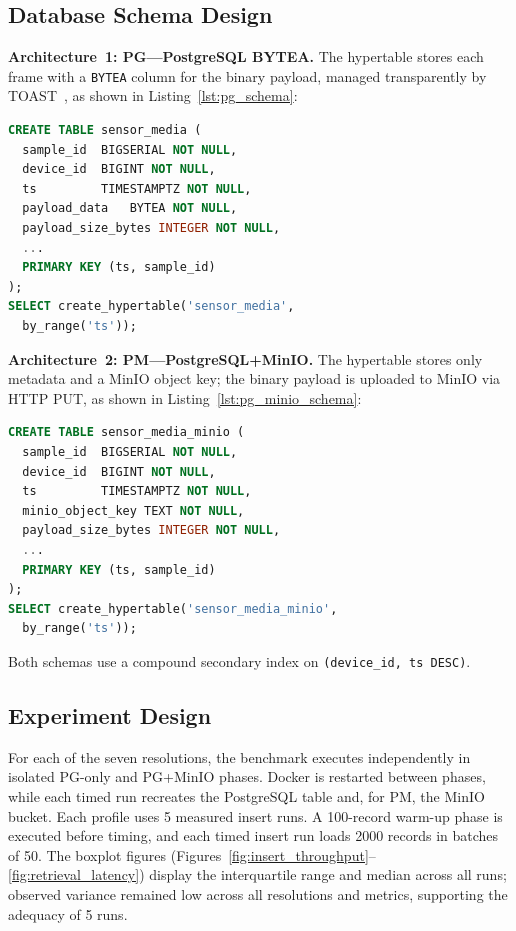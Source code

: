 \documentclass[conference, a4paper]{IEEEtran}
\begin{document}
\subsection{Database Schema Design}
\textbf{Architecture~1: PG---PostgreSQL BYTEA.} The hypertable stores each frame with a \texttt{BYTEA} column for the binary payload, managed transparently by TOAST~\cite{postgresql_toast_docs}, as shown in Listing~\ref{lst:pg_schema}:

\begin{lstlisting}[language=SQL,basicstyle=\ttfamily\scriptsize,breaklines=true,caption={PG schema: inline BYTEA storage.},label={lst:pg_schema}]
CREATE TABLE sensor_media (
  sample_id  BIGSERIAL NOT NULL,
  device_id  BIGINT NOT NULL,
  ts         TIMESTAMPTZ NOT NULL,
  payload_data   BYTEA NOT NULL,
  payload_size_bytes INTEGER NOT NULL,
  ...
  PRIMARY KEY (ts, sample_id)
);
SELECT create_hypertable('sensor_media',
  by_range('ts'));
\end{lstlisting}

\textbf{Architecture~2: PM---PostgreSQL+MinIO.} The hypertable stores only metadata and a MinIO object key; the binary payload is uploaded to MinIO via HTTP PUT, as shown in Listing~\ref{lst:pg_minio_schema}:

\begin{lstlisting}[language=SQL,basicstyle=\ttfamily\scriptsize,breaklines=true,caption={PM schema: externalized MinIO storage.},label={lst:pg_minio_schema}]
CREATE TABLE sensor_media_minio (
  sample_id  BIGSERIAL NOT NULL,
  device_id  BIGINT NOT NULL,
  ts         TIMESTAMPTZ NOT NULL,
  minio_object_key TEXT NOT NULL,
  payload_size_bytes INTEGER NOT NULL,
  ...
  PRIMARY KEY (ts, sample_id)
);
SELECT create_hypertable('sensor_media_minio',
  by_range('ts'));
\end{lstlisting}

Both schemas use a compound secondary index on \texttt{(device\_id, ts DESC)}.

\subsection{Experiment Design}
For each of the seven resolutions, the benchmark executes independently in isolated PG-only and PG+MinIO phases. Docker is restarted between phases, while each timed run recreates the PostgreSQL table and, for PM, the MinIO bucket. Each profile uses 5 measured insert runs. A 100-record warm-up phase is executed before timing, and each timed insert run loads 2000 records in batches of 50. The boxplot figures (Figures~\ref{fig:insert_throughput}--\ref{fig:retrieval_latency}) display the interquartile range and median across all runs; observed variance remained low across all resolutions and metrics, supporting the adequacy of 5 runs.
\end{document}
